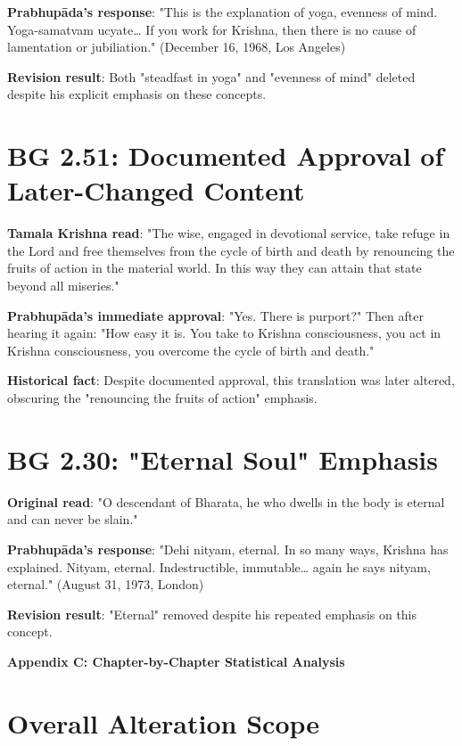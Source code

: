 \documentclass[11pt,twoside]{book}
\begin{document}
\textbf{\textbf{Prabhupāda's response}}: "This is the explanation of yoga, evenness of mind. Yoga-samatvam ucyate\ldots{} If you work for Krishna, then there is no cause of lamentation or jubiliation." (December 16, 1968, Los Angeles)

\textbf{\textbf{Revision result}}: Both "steadfast in yoga" and "evenness of mind" deleted despite his explicit emphasis on these concepts.
\section*{BG 2.51: Documented Approval of Later-Changed Content}
\label{sec:org08547af}
\textbf{\textbf{Tamala Krishna read}}: "The wise, engaged in devotional service, take refuge in the Lord and free themselves from the cycle of birth and death by renouncing the fruits of action in the material world. In this way they can attain that state beyond all miseries."

\textbf{\textbf{Prabhupāda's immediate approval}}: "Yes. There is purport?" Then after hearing it again: "How easy it is. You take to Krishna consciousness, you act in Krishna consciousness, you overcome the cycle of birth and death."

\textbf{\textbf{Historical fact}}: Despite documented approval, this translation was later altered, obscuring the "renouncing the fruits of action" emphasis.
\section*{BG 2.30: "Eternal Soul" Emphasis}
\label{sec:org4f4c108}
\textbf{\textbf{Original read}}: "O descendant of Bharata, he who dwells in the body is eternal and can never be slain."

\textbf{\textbf{Prabhupāda's response}}: "Dehi nityam, eternal. In so many ways, Krishna has explained. Nityam, eternal. Indestructible, immutable\ldots{} again he says nityam, eternal." (August 31, 1973, London)

\textbf{\textbf{Revision result}}: "Eternal" removed despite his repeated emphasis on this concept.

\clearpage
\pagestyle{sectionopening}
\thispagestyle{sectionopening}
\markboth{}{}
\markright{}
\vspace*{0.25\textheight}
\begin{center}
{\Huge\bfseries Appendix C: Chapter-by-Chapter Statistical Analysis}
\end{center}
\newpage
\section*{Overall Alteration Scope}
\label{sec:orgfb5bca1}
\end{document}
